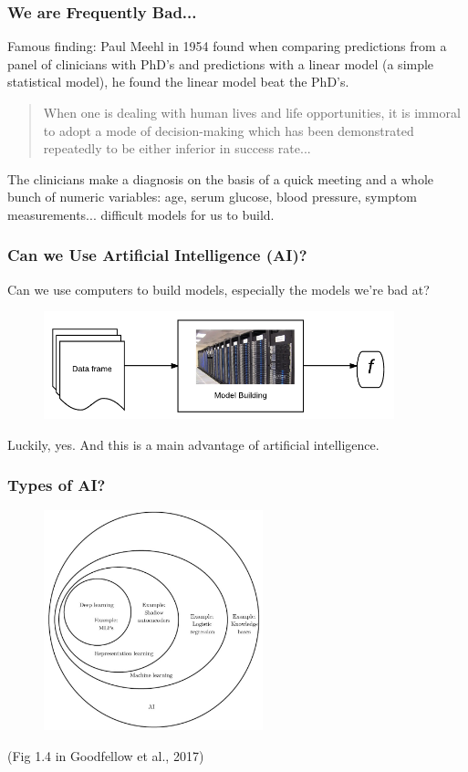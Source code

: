 \documentclass[slides]{beamer} %
\begin{document}
\begin{frame}\frametitle{We are Frequently Bad...}

Famous finding: Paul Meehl in 1954 found when comparing predictions from a panel of clinicians with PhD's and predictions with a linear model (a simple statistical model), he found the linear model beat the PhD's.


\begin{quotation}\footnotesize
When one is dealing with human lives and life opportunities, it is immoral to adopt a mode of decision-making which has been demonstrated repeatedly to be either inferior in success rate...
\end{quotation}

The clinicians make a diagnosis on the basis of a quick meeting and a whole bunch of numeric variables: age, serum glucose, blood pressure, symptom measurements... difficult models for us to build.

\end{frame}


\begin{frame}\frametitle{Can we Use Artificial Intelligence (AI)?}

Can we use computers to build models, especially the models we're bad at? 

\begin{figure}
\centering
\includegraphics[width=4in]{machine_learning}
\end{figure}
	
Luckily, yes. And this is a main advantage of artificial intelligence.

\end{frame}

\begin{frame}\frametitle{Types of AI?}

\begin{figure}
\centering
\includegraphics[width=2.5in]{fig14.jpg}
\end{figure}

(Fig 1.4 in Goodfellow et al., 2017)

\end{frame}
\end{document}
